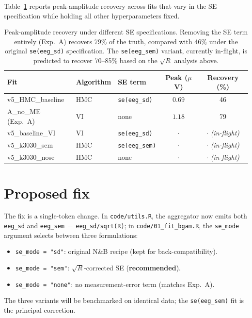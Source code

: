 \documentclass[11pt]{article}
\begin{document}
Table~\ref{tab:recovery} reports peak-amplitude recovery across
fits that vary in the SE specification while holding all other
hyperparameters fixed.

\begin{table}[h]
\centering
\small
\begin{tabular}{lllcc}
\toprule
Fit                  & Algorithm & SE term         & Peak ($\mu$V) & Recovery (\%) \\
\midrule
v5\_HMC\_baseline    & HMC       & \texttt{se(eeg\_sd)}  & $0.69$ & 46 \\
A\_no\_ME (Exp.\ A)  & VI        & none                  & $1.18$ & 79 \\
v5\_baseline\_VI     & VI        & \texttt{se(eeg\_sd)}  & $\cdot$ & $\cdot$ \emph{(in-flight)} \\
v5\_k3030\_sem       & HMC       & \texttt{se(eeg\_sem)} & $\cdot$ & $\cdot$ \emph{(in-flight)} \\
v5\_k3030\_nose      & HMC       & none                  & $\cdot$ & $\cdot$ \emph{(in-flight)} \\
\bottomrule
\end{tabular}
\caption{Peak-amplitude recovery under different SE specifications.
Removing the SE term entirely (Exp.\ A) recovers 79\% of the
truth, compared with 46\% under the original
\texttt{se(eeg\_sd)} specification. The \texttt{se(eeg\_sem)}
variant, currently in-flight, is predicted to recover 70--85\%
based on the $\sqrt{R}$ analysis above.}
\label{tab:recovery}
\end{table}

\section{Proposed fix}

The fix is a single-token change. In
\texttt{code/utils.R}, the aggregator now emits both
\texttt{eeg\_sd} and \texttt{eeg\_sem}\,$=\,$\texttt{eeg\_sd/sqrt(R)};
in \texttt{code/01\_fit\_bgam.R}, the \texttt{se\_mode} argument
selects between three formulations:
\begin{itemize}
\item \texttt{se\_mode = "sd"}: original N\&B recipe (kept for
  back-compatibility).
\item \texttt{se\_mode = "sem"}: $\sqrt{R}$-corrected SE
  (\textbf{recommended}).
\item \texttt{se\_mode = "none"}: no measurement-error term
  (matches Exp.\ A).
\end{itemize}
The three variants will be benchmarked on identical data; the
\texttt{se(eeg\_sem)} fit is the principal correction.
\end{document}
